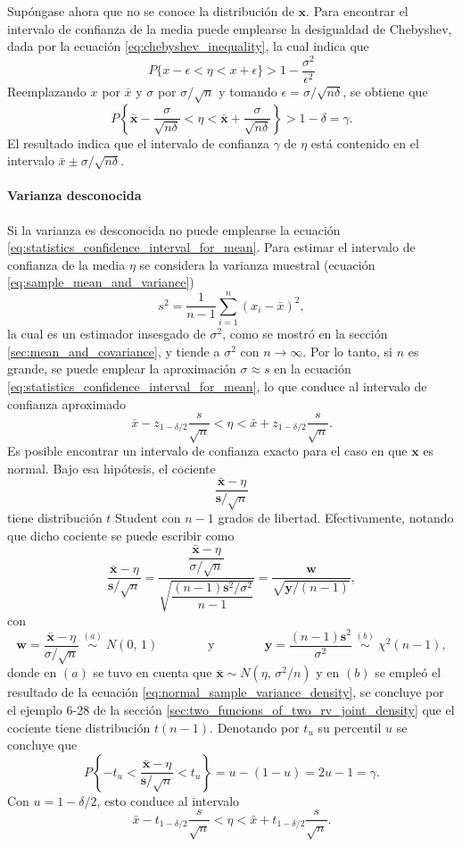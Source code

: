 \documentclass[a4paper]{report}
\newcommand{\x}{\mathbf{x}}
\newcommand{\y}{\mathbf{y}}
\newcommand{\w}{\mathbf{w}}
\newcommand{\s}{\mathbf{s}}
\begin{document}
Supóngase ahora que no se conoce la distribución de \(\x\). Para encontrar el intervalo de confianza de la media puede emplearse la desigualdad de Chebyshev, dada por la ecuación \ref{eq:chebyshev_inequality}, la cual indica que
\[
 P\{x-\epsilon<\eta<x+\epsilon\}>1-\frac{\sigma^2}{\epsilon^2}
\]
Reemplazando \(x\) por \(\bar{x}\) y \(\sigma\) por \(\sigma/\sqrt{n}\) y tomando \(\epsilon=\sigma/\sqrt{n\delta}\), se obtiene que 
\begin{equation}\label{eq:statistics_confidence_interval_for_mean_unknown_dist}
  P\left\{\bar{\x}-\frac{\sigma}{\sqrt{n\delta}}<\eta<\bar{\x}+\frac{\sigma}{\sqrt{n\delta}}\right\}>1-\delta=\gamma.
\end{equation}
El resultado indica que el intervalo de confianza \(\gamma\) de \(\eta\) está contenido en el intervalo \(\bar{x}\pm\sigma/\sqrt{n\delta}\). 

\paragraph{Varianza desconocida} Si la varianza es desconocida no puede emplearse la ecuación \ref{eq:statistics_confidence_interval_for_mean}. Para estimar el intervalo de confianza de la media \(\eta\) se considera la varianza muestral (ecuación \ref{eq:sample_mean_and_variance})
\[
 s^2=\frac{1}{n-1}\sum_{i=1}^{n}(x_i-\bar{x})^2,
\]
la cual es un estimador insesgado de \(\sigma^2\), como se mostró en la sección \ref{sec:mean_and_covariance}, y tiende a \(\sigma^2\) con \(n\to\infty\). Por lo tanto, si \(n\) es grande, se puede emplear la aproximación \(\sigma\approx s\) en la ecuación \ref{eq:statistics_confidence_interval_for_mean}, lo que conduce al intervalo de confianza aproximado
\[
 \bar{x}-z_{1-\delta/2}\dfrac{s}{\sqrt{n}}<\eta<\bar{x}+z_{1-\delta/2}\dfrac{s}{\sqrt{n}}.
\]
Es posible encontrar un intervalo de confianza exacto para el caso en que \(\x\) es normal. Bajo esa hipótesis, el cociente
\[
 \frac{\bar{\x}-\eta}{\s/\sqrt{n}}
\]
tiene distribución \(t\) Student con \(n-1\) grados de libertad. Efectivamente, notando que dicho cociente se puede escribir como
\[
 \frac{\bar{\x}-\eta}{\s/\sqrt{n}}=\dfrac{\dfrac{\bar{\x}-\eta}{\sigma/\sqrt{n}}}{\sqrt{\dfrac{(n-1)\s^2/\sigma^2}{n-1}}}=\frac{\w}{\sqrt{\y/(n-1)}},
\]
con
\[
 \w=\dfrac{\bar{\x}-\eta}{\sigma/\sqrt{n}}\;\overset{(a)}{\sim}\;N(0,\,1)
  \qquad\qquad\textrm{y}\qquad\qquad
 \y=\frac{(n-1)\s^2}{\sigma^2}\;\overset{(b)}{\sim}\;\chi^2(n-1),
\]
donde en \((a)\) se tuvo en cuenta que \(\bar{\x}\sim N(\eta,\,\sigma^2/n)\) y en \((b)\) se empleó el resultado de la ecuación \ref{eq:normal_sample_variance_density}, se concluye por el ejemplo 6-28 de la sección \ref{sec:two_funcions_of_two_rv_joint_density} que el cociente tiene distribución \(t(n-1)\). Denotando por \(t_u\) su percentil \(u\) se concluye que 
\[
 P\left\{-t_u<\frac{\bar{\x}-\eta}{\s/\sqrt{n}}<t_u\right\}=u-(1-u)=2u-1=\gamma.
\]
Con \(u=1-\delta/2\), esto conduce al intervalo
\[
 \bar{x}-t_{1-\delta/2}\frac{s}{\sqrt{n}}<\eta<\bar{x}+t_{1-\delta/2}\frac{s}{\sqrt{n}}.
\]
\end{document}
